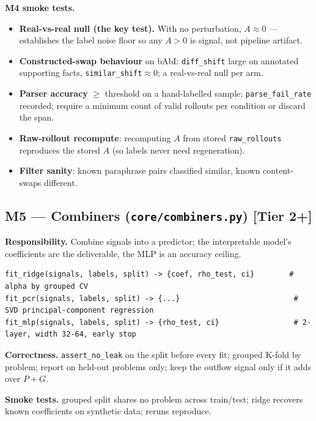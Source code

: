 \documentclass[11pt]{article}
\begin{document}
\textbf{M4 smoke tests.}
\begin{itemize}
\item \textbf{Real-vs-real null (the key test).} With no perturbation, $A\approx0$ --- establishes the
label noise floor so any $A>0$ is signal, not pipeline artifact.
\item \textbf{Constructed-swap behaviour} on bAbI: \texttt{diff\_shift} large on annotated supporting
facts, \texttt{similar\_shift}$\approx0$; a real-vs-real null per arm.
\item \textbf{Parser accuracy} $\ge$ threshold on a hand-labelled sample; \texttt{parse\_fail\_rate}
recorded; require a minimum count of valid rollouts per condition or discard the span.
\item \textbf{Raw-rollout recompute}: recomputing $A$ from stored \texttt{raw\_rollouts} reproduces the
stored $A$ (so labels never need regeneration).
\item \textbf{Filter sanity}: known paraphrase pairs classified similar, known content-swaps different.
\end{itemize}

\subsection{M5 --- Combiners (\texttt{core/combiners.py}) [Tier 2+]}
\textbf{Responsibility.} Combine signals into a predictor; the interpretable model's coefficients are
the deliverable, the MLP is an accuracy ceiling.
\begin{lstlisting}
fit_ridge(signals, labels, split) -> {coef, rho_test, ci}        # alpha by grouped CV
fit_pcr(signals, labels, split) -> {...}                          # SVD principal-component regression
fit_mlp(signals, labels, split) -> {rho_test, ci}                 # 2-layer, width 32-64, early stop
\end{lstlisting}
\textbf{Correctness.} \texttt{assert\_no\_leak} on the split before every fit; grouped K-fold by problem;
report on held-out problems only; keep the outflow signal only if it adds over $P{+}G$.

\textbf{Smoke tests.} grouped split shares no problem across train/test; ridge recovers known
coefficients on synthetic data; reruns reproduce.
\end{document}
